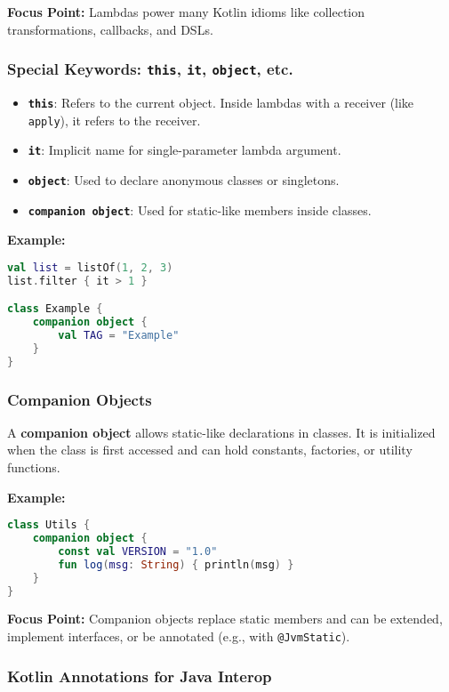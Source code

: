 \documentclass[a4paper,12pt]{article}
\begin{document}
\textbf{Focus Point:} Lambdas power many Kotlin idioms like collection transformations, callbacks, and DSLs.

\subsubsection{Special Keywords: \texttt{this}, \texttt{it}, \texttt{object}, etc.}

\begin{itemize}
  \item \textbf{\texttt{this}}: Refers to the current object. Inside lambdas with a receiver (like \texttt{apply}), it refers to the receiver.
  \item \textbf{\texttt{it}}: Implicit name for single-parameter lambda argument.
  \item \textbf{\texttt{object}}: Used to declare anonymous classes or singletons.
  \item \textbf{\texttt{companion object}}: Used for static-like members inside classes.
\end{itemize}

\textbf{Example:}
\begin{lstlisting}[language=Kotlin]
val list = listOf(1, 2, 3)
list.filter { it > 1 }

class Example {
    companion object {
        val TAG = "Example"
    }
}
\end{lstlisting}

\subsubsection{Companion Objects}

A \textbf{companion object} allows static-like declarations in classes. It is initialized when the class is first accessed and can hold constants, factories, or utility functions.

\textbf{Example:}
\begin{lstlisting}[language=Kotlin]
class Utils {
    companion object {
        const val VERSION = "1.0"
        fun log(msg: String) { println(msg) }
    }
}
\end{lstlisting}

\textbf{Focus Point:} Companion objects replace static members and can be extended, implement interfaces, or be annotated (e.g., with \texttt{@JvmStatic}).

\subsubsection{Kotlin Annotations for Java Interop}
\end{document}

